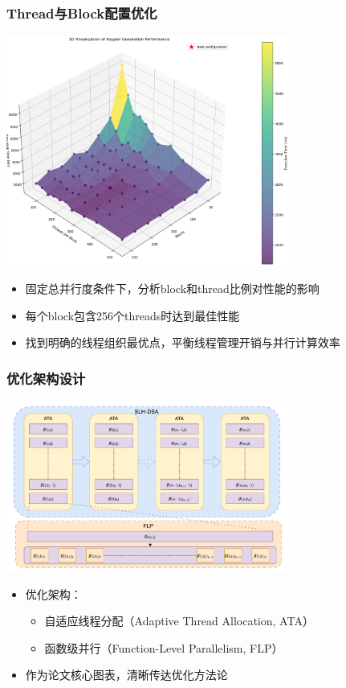 \documentclass[slide]{../../custom}
\begin{document}
\begin{frame}
  \frametitle{Thread与Block配置优化}
  \begin{center}
    \includegraphics[width=0.7\textwidth]{./fig/block_thread_time.png}
  \end{center}
  \begin{itemize}
    \item 固定总并行度条件下，分析block和thread比例对性能的影响
    \item 每个block包含256个threads时达到最佳性能
    \item 找到明确的线程组织最优点，平衡线程管理开销与并行计算效率
  \end{itemize}
\end{frame}

\begin{frame}
  \frametitle{优化架构设计}
  \begin{center}
    \includegraphics[width=0.7\textwidth]{./fig/optimize-overview.pdf}
  \end{center}
  \begin{itemize}
    \item 优化架构：
      \begin{itemize}
        \item 自适应线程分配（Adaptive Thread Allocation, ATA）
        \item 函数级并行（Function-Level Parallelism, FLP）
      \end{itemize}
    \item 作为论文核心图表，清晰传达优化方法论
  \end{itemize}
\end{frame}
\end{document}
